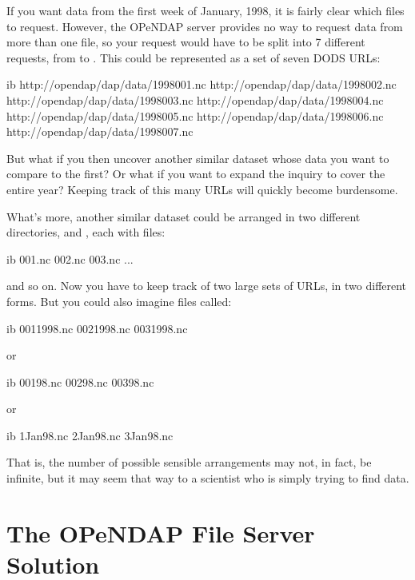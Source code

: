 If you want data from the first week of January, 1998, it is fairly
clear which files to request.  However, the OPeNDAP server provides
no way to request data from more than one file, so your request would
have to be split into 7 different requests, from  to
.  This could be represented as a set of seven DODS
URLs: 

\begin{vcode}{ib}
http://opendap/dap/data/1998001.nc
http://opendap/dap/data/1998002.nc
http://opendap/dap/data/1998003.nc
http://opendap/dap/data/1998004.nc
http://opendap/dap/data/1998005.nc
http://opendap/dap/data/1998006.nc
http://opendap/dap/data/1998007.nc
\end{vcode}

But what if you then uncover another similar dataset whose data you
want to compare to the first?  Or what if you want to expand the
inquiry to cover the entire year?  Keeping track of this many URLs
will quickly become burdensome.

What's more, another similar dataset could be arranged in two
different directories,  and , each with files:

\begin{vcode}{ib}
001.nc
002.nc
003.nc
...
\end{vcode}

and so on.  Now you have to keep track of two large sets of URLs, in
two different forms.  But you could also imagine files called:

\begin{vcode}{ib}
0011998.nc
0021998.nc
0031998.nc
\end{vcode}

or 

\begin{vcode}{ib}
00198.nc
00298.nc
00398.nc
\end{vcode}

or 

\begin{vcode}{ib}
1Jan98.nc
2Jan98.nc
3Jan98.nc
\end{vcode}

That is, the number of possible sensible arrangements may not, in
fact, be infinite, but it may seem that way to a scientist who is
simply trying to find data.


\section{The OPeNDAP File Server Solution}
\label{fs,solution}

